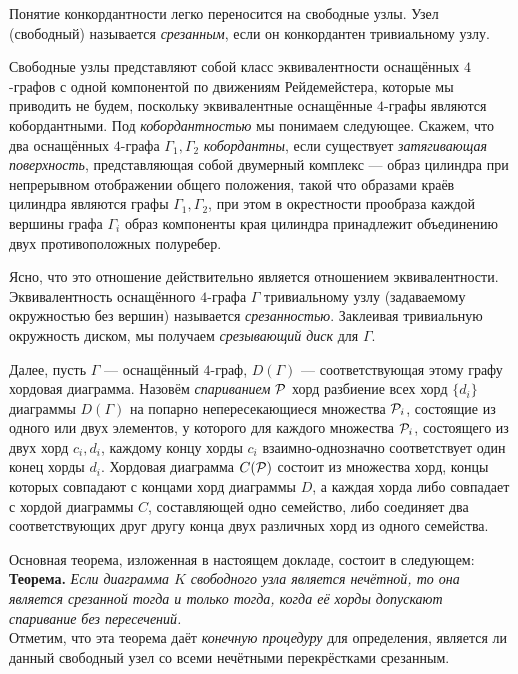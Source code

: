Понятие конкордантности легко переносится на свободные узлы. Узел (свободный) называется {\em срезанным}, если он конкордантен тривиальному узлу.

Свободные узлы представляют собой класс эквивалентности оснащённых $4$-графов с одной компонентой по движениям Рейдемейстера, которые мы приводить не будем, поскольку эквивалентные оснащённые $4$-графы являются кобордантными. Под {\em кобордантностью} мы понимаем следующее. Скажем, что два оснащённых  $4$-графа
 $\Gamma_{1},\Gamma_{2}$ {\em кобордантны}, если существует {\em затягивающая поверхность}, представляющая собой двумерный комплекс --- образ цилиндра при непрерывном отображении общего положения, такой что образами краёв цилиндра являются графы $\Gamma_{1},\Gamma_{2}$, при этом в окрестности прообраза каждой вершины графа $\Gamma_{i}$ образ компоненты края цилиндра принадлежит объединению двух противоположных полуребер.

Ясно, что это отношение действительно является отношением эквивалентности. Эквивалентность оснащённого $4$-графа $\Gamma$ тривиальному узлу (задаваемому окружностью без вершин) называется {\em срезанностью}. Заклеивая тривиальную окружность диском, мы получаем {\em срезывающий диск} для $\Gamma$.

Далее, пусть $\Gamma$ --- оснащённый $4$-граф, $D(\Gamma)$ --- соответствующая этому графу хордовая диаграмма. Назовём {\em спариванием} ${\cal P}$ хорд разбиение всех хорд $\{d_{i}\}$ диаграммы $D(\Gamma)$ на попарно непересекающиеся множества ${\cal P}_{i}$, состоящие из одного или двух элементов, у которого для каждого множества ${\cal P}_{i}$, состоящего из двух хорд $c_{i},d_{i}$, каждому концу хорды $c_{i}$ взаимно-однозначно соответствует один конец хорды $d_{i}$. Хордовая диаграмма $C({\cal P})$ состоит из множества хорд, концы которых совпадают с концами хорд диаграммы $D$, а каждая хорда либо совпадает с хордой диаграммы $C$, составляющей одно семейство, либо соединяет два соответствующих друг другу конца двух различных хорд из одного семейства.

Основная теорема, изложенная в настоящем докладе, состоит в следующем: \\

{\bf Теорема.} {\it Если диаграмма $K$ свободного узла является {\em нечётной}, то она является {\em срезанной} тогда и только тогда, когда её хорды допускают {\em спаривание без пересечений}. } \\

Отметим, что эта теорема даёт {\em конечную процедуру} для определения, является ли данный
свободный узел со всеми нечётными перекрёстками срезанным.

